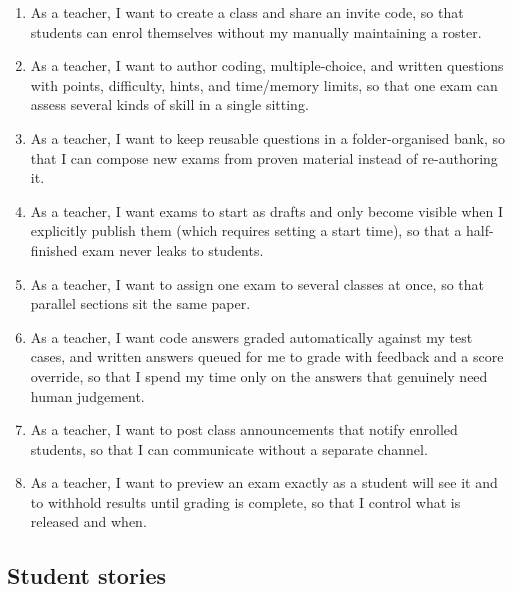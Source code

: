 \begin{enumerate}[label=\textbf{ST-T\arabic*},leftmargin=3.2em]
  \item As a teacher, I want to create a class and share an invite code, so that
        students can enrol themselves without my manually maintaining a roster.
  \item As a teacher, I want to author coding, multiple-choice, and written questions
        with points, difficulty, hints, and time/memory limits, so that one exam can
        assess several kinds of skill in a single sitting.
  \item As a teacher, I want to keep reusable questions in a folder-organised bank, so
        that I can compose new exams from proven material instead of re-authoring it.
  \item As a teacher, I want exams to start as drafts and only become visible when I
        explicitly publish them (which requires setting a start time), so that a
        half-finished exam never leaks to students.
  \item As a teacher, I want to assign one exam to several classes at once, so that
        parallel sections sit the same paper.
  \item As a teacher, I want code answers graded automatically against my test cases,
        and written answers queued for me to grade with feedback and a score override,
        so that I spend my time only on the answers that genuinely need human judgement.
  \item As a teacher, I want to post class announcements that notify enrolled students,
        so that I can communicate without a separate channel.
  \item As a teacher, I want to preview an exam exactly as a student will see it and to
        withhold results until grading is complete, so that I control what is released
        and when.
\end{enumerate}

\subsection*{Student stories}

